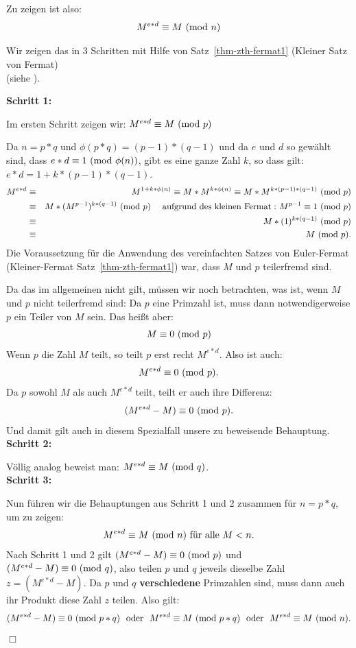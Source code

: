 \begin{refsegment}
\noindent Zu zeigen ist also:
   $$ M^{e * d}  \equiv  M  {\rm ~(mod~} n) $$

\noindent Wir zeigen das in 3 Schritten mit Hilfe von Satz~\ref{thm-zth-fermat1} (Kleiner Satz von Fermat)\\ (siehe \cite[S. 131ff]{Beutelspacher1996}).

\noindent \textbf{Schritt 1:}

\noindent Im ersten Schritt zeigen wir: $M^{e * d} \equiv M{\rm ~(mod~}p)$

\noindent Da $n=p*q$ und $\phi(p*q)=(p-1)*(q-1)$ und da $e$ und $d$ so gewählt sind, dass $e*d \equiv 1 {\rm ~(mod~}\phi(n))$,
gibt es eine ganze Zahl $k$, so dass gilt: $e*d = 1 + k*(p-1)*(q-1)$.
\begin{eqnarray*}
M^{e * d}  & \equiv & M^{1+k*\phi(n)} \equiv M * M^{k*\phi(n)} \equiv M * M^{k*(p-1)*(q-1)}{\rm ~(mod~}p) \nonumber\\
           & \equiv & M * (M^{p-1})^{k*(q-1)}{\rm ~(mod~}p) \quad {\rm ~aufgrund~des~kleinen~Fermat:~}
                  M^{p-1} \equiv 1 {\rm~(mod~}p) \nonumber\\
           & \equiv & M * (1)^{k*(q-1)} {\rm~(mod~}p) \nonumber\\
       & \equiv & M {\rm ~(mod~}p). \nonumber
\end{eqnarray*}
Die Voraussetzung für die Anwendung des vereinfachten Satzes von Euler-Fermat
(Kleiner-Fermat Satz~\ref{thm-zth-fermat1}) war, dass $M$ und $p$
teilerfremd sind.

Da das im allgemeinen nicht gilt, müssen wir noch betrachten, was ist, wenn
$M$ und $p$ nicht teilerfremd sind: Da $p$ eine Primzahl ist, muss dann
notwendigerweise $p$ ein Teiler von $M$ sein. Das heißt aber:
$$  M \equiv 0 {\rm ~(mod~}p) $$
Wenn $p$ die Zahl $M$ teilt, so teilt $p$ erst recht $M^{e * d}$. Also ist auch:
$$M^{e * d} \equiv 0 {\rm ~(mod~}p).$$
Da $p$ sowohl $M$ als auch $M^{e * d}$ teilt, teilt er auch ihre Differenz:
$$ (M^{e * d} - M ) \equiv 0 {\rm ~(mod~}p).$$
Und damit gilt auch in diesem Spezialfall unsere zu beweisende Behauptung.\\

\noindent \textbf{Schritt 2:}

\noindent Völlig analog beweist man:  $M^{e * d} \equiv M{\rm ~(mod~}q)$.\\

\noindent \textbf{Schritt 3:}

\noindent Nun führen wir die Behauptungen aus Schritt 1 und 2 zusammen für
$n=p*q$, um zu zeigen:
$$ M^{e * d} \equiv M{\rm ~(mod~}n) \mbox{~für~alle~} M < n. $$
Nach Schritt 1 und 2 gilt $(M^{e * d} - M) \equiv 0 {\rm ~(mod~} p)$ und $(M^{e * d} - M) \equiv 0 {\rm ~(mod~} q)$,
also teilen $p$ und $q$ jeweils dieselbe Zahl $z = (M^{e * d} - M)$.
Da $p$ und $q$ \textbf{verschiedene} Primzahlen sind, muss dann auch ihr Produkt diese Zahl $z$ teilen. Also gilt:
$$
(M^{e * d} - M) \equiv 0 {\rm ~(mod~}p*q) {\rm ~~oder~~ } M^{e * d} \equiv M {\rm ~(mod~}p*q) {\rm ~~oder~~}
 M^{e * d} \equiv M {\rm ~(mod~}n).
$$
\hfill$\Box$



\end{refsegment}
